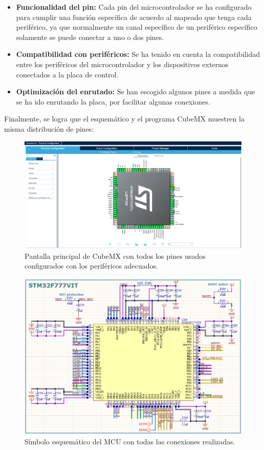 \begin{itemize}
	\item \textbf{Funcionalidad del pin:} Cada pin del microcontrolador se ha configurado para cumplir una función específica de acuerdo al mapeado que tenga cada periférico, ya que normalmente un canal específico de un periférico específico solamente se puede conectar a uno o dos pines.
	
	\item \textbf{Compatibilidad con periféricos:} Se ha tenido en cuenta la compatibilidad entre los periféricos del microcontrolador y los dispositivos externos conectados a la placa de control.
	
	\item \textbf{Optimización del enrutado:} Se han escogido algunos pines a medida que se ha ido enrutando la placa, por facilitar algunas conexiones.
	
\end{itemize}

Finalmente, se logra que el esquemático y el programa CubeMX muestren la misma distribución de pines:

\begin{figure}[H]
	\centering
	\includegraphics[width=0.7\linewidth]{fig/cubeMX}
	\caption{Pantalla principal de CubeMX con todos los pines usados configurados con los periféricos adecuados.}
\end{figure}

\begin{figure}[H]
	\centering
	\includegraphics[width=0.7\linewidth]{fig/schMCU}
	\caption{Símbolo esquemático del MCU con todas las conexiones realizadas.}
\end{figure}

